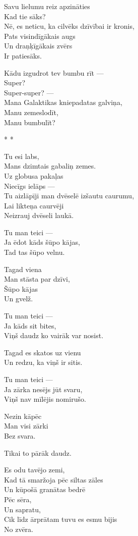 \documentclass[14pt]{extarticle}
\begin{document}
Savu lielumu reiz apzināties\\
Kad tie sāks?\\
Nē, es neticu, ka cilvēks dzīvībai ir kronis,\\
Pats visindīgākais augs\\
Un draņķīgākais zvērs\\
Ir patiesāks.

Kādu izgudrot tev bumbu rīt ---\\
Super?\\
Super-super? ---\\
Mana Galaktikas kniepadatas galviņa,\\
Manu zemeslodīt,\\
Manu bumbulīt?


\newpage

{\large \sc  * * *}

Tu esi labs,\\
Mans dzimtais gabaliņ zemes.\\
Uz globusa pakaļas\\
Niecīgs ielāps ---\\
Tu aizlāpīji man dvēselē izšautu caurumu,\\
Lai likteņa caurvēji\\
Neizrauj dvēseli laukā.

Tu man teici ---\\
Ja ēdot kāds šūpo kājas,\\
Tad tas šūpo velnu.

Tagad viena\\
Man stāsta par dzīvi,\\
Šūpo kājas\\
Un gvelž.

Tu man teici ---\\
Ja kāds sit bites,\\
Viņš daudz ko vairāk var nosist.

Tagad es skatos uz vienu\\
Un redzu, ka viņš ir sitis.

Tu man teici ---\\
Ja zārka nesējs jūt svaru,\\
Viņš nav mīlējis nomirušo.

Nezin kāpēc\\
Man visi zārki\\
Bez svara.

Tikai to pārāk daudz.

Es odu tavējo zemi,\\
Kad tā smaržoja pēc siltas zāles\\
Un kūpošā granātas bedrē\\
Pēc sēra,\\
Un sapratu,\\
Cik līdz ārprātam tuvu es esmu bijis\\
No zvēra.
\end{document}
